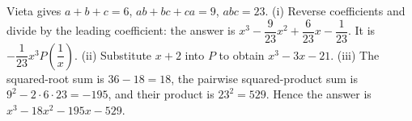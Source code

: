 Vieta gives $a+b+c=6$, $ab+bc+ca=9$, $abc=23$. (i) Reverse coefficients and divide by the leading coefficient: the answer is $\boxed{x^3-\dfrac{9}{23}x^2+\dfrac{6}{23}x-\dfrac{1}{23}}$. It is $-\dfrac{1}{23}x^3P(\dfrac{1}{x})$. (ii) Substitute $x+2$ into $P$ to obtain $\boxed{x^3-3x-21}$. (iii) The squared-root sum is $36-18=18$, the pairwise squared-product sum is $9^2-2\cdot6\cdot23=-195$, and their product is $23^2=529$. Hence the answer is $\boxed{x^3-18x^2-195x-529}$.
